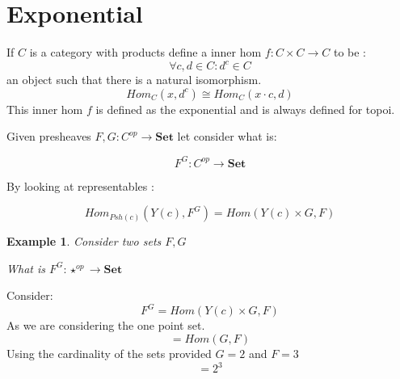 \documentclass[twoside]{article}
\newtheorem{ex}{Example}[section]
\begin{document}
\section{Exponential}

If $C$ is a category with products define a inner hom $f : C \times C \rightarrow C$ to
be :
$$ \forall c,d \in C : d^{c} \in C $$
an object such that there is a natural isomorphism.
$$ Hom_{C}(x,d^{c}) \cong Hom_{C}(x \cdot c,d) $$
This inner hom $f$ is defined as the exponential and is always defined for topoi.

Given presheaves $F,G : C^{op} \rightarrow \mathbf{Set} $ let consider what is:

$$F^{G} : C^{op} \rightarrow \mathbf{Set} $$

By looking at representables :

$$Hom_{Psh(c)}(Y(c),F^{G}) = Hom(Y(c) \times G,F)$$

\begin{ex}
  Consider two sets $F,G$\\
\begin{figure}[!h]
  \centering
{}
\end{figure}

  What is $F^{G}:\star^{op} \rightarrow \mathbf{Set}$\\
\end{ex}
  Consider:
  $$F^{G} = Hom(Y(c) \times G,F)$$
  As we are considering the one point set.
  $$= Hom(G,F)$$
  Using the cardinality of the sets provided $G=2$ and $F=3$
  $$= 2^3$$
\end{document}
